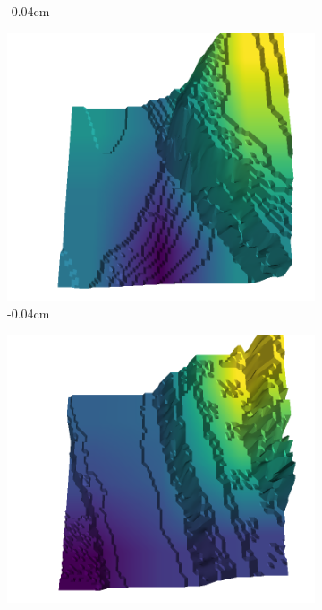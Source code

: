 \documentclass[../document.tex]{subfiles}
\begin{document}
\begin{figure}[H]
\begin{subfigure}[b]{0.242\linewidth}
    \caption{-0.04cm}
    \end{subfigure}
    \begin{subfigure}[b]{0.242\linewidth}
    \includegraphics[width=\linewidth]{../img/5/quarry/worst/01-patch-3d-majavi-colormap-40.png}
    \caption{-0.04cm}
    \end{subfigure}
    \begin{subfigure}[b]{0.242\linewidth}
    \includegraphics[width=\linewidth]{../img/5/quarry/worst/01-patch-3d-majavi-colormap-45.png}

\end{subfigure}
\end{figure}
\end{document}
